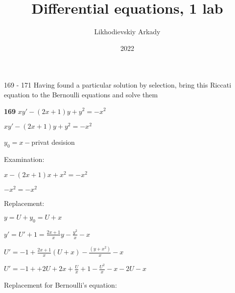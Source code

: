 \documentclass{article}
\title{Differential equations, 1 lab}
\author{Likhodievskiy Arkady}
\date{2022}
\begin{document}
\maketitle
\newpage

169 - 171 Having found a particular solution by selection, bring this Riccati equation to the Bernoulli equations and solve them

\begin{flushleft}
{\bf 169 } $xy'-(2x+1)y+y^2=-x^2$

\end{flushleft}


\begin{left} 
\begin{spacing}{1.5}
$xy'-(2x+1)y+y^2=-x^2$

$y_0 = x - $privat desision
\end{spacing}
\end{left}
Examination:
\begin{left} 
\begin{spacing}{1.5}
$x -(2x+1)x+x^2=-x^2$

$-x^2=-x^2$
\end{spacing}
\end{left}
Replacement:
\begin{left} 
\begin{spacing}{2.5}
$y=U+y_0 = U+x$

$\displaystyle y'=U'+1=\frac{2x+1}{x}y-\frac{y^2}{x}-x$

$\displaystyle U'=-1+\frac{2x+1}{x}(U+x)-\frac{(y+x^2)}{x}-x$

$\displaystyle U'=-1++2U+2x+\frac{U}{x}+1-\frac{U^2}{x}-x-2U-x$

\end{spacing}
\end{left}
Replacement for Bernoulli's equation:
\end{document}
